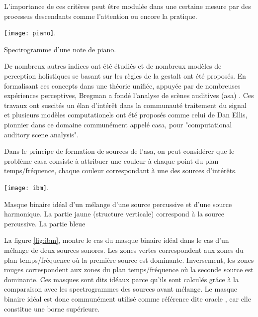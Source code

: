 L'importance de ces critères peut être modulée dans une certaine mesure par des processus descendants comme l'attention ou encore la pratique.

\begin{marginfigure}
  \texttt{[image: piano]}.
  \caption{Spectrogramme d'une note de piano.}
  \label{fig:piano}
\end{marginfigure}

De nombreux autres indices ont été étudiés et de nombreux modèles de perception holistiques se basant sur les règles de la gestalt ont été proposés. En formalisant ces concepts dans une théorie unifiée, appuyée par de nombreuses expériences perceptives, Bregman a fondé l'analyse de scènes auditives (asa) \cite{bregman1994auditory}. Ces travaux ont suscités un élan d'intérêt dans la communauté traitement du signal et plusieurs modèles computationels ont été proposés comme celui de Dan Ellis\cite{ellis}, pionnier dans ce domaine communément appelé casa, pour "computational auditory scene analysis".


Dans le principe de formation de sources de l'asa, on peut considérer que le problème casa consiste à attribuer une couleur à chaque point du plan temps/fréquence, chaque couleur correspondant à une des sources d'intérêts.

\begin{marginfigure}
  \texttt{[image: ibm]}.
  \caption{Masque binaire idéal d'un mélange d'une source percussive et d'une source harmonique. La partie jaune (structure verticale) correspond à la source percussive. La partie bleue}
\end{marginfigure}

La figure \ref{fig:ibm}, montre le cas du masque binaire idéal dans le cas d'un mélange de deux sources sonores. Les zones vertes correspondent aux zones du plan temps/fréquence où la première source est dominante. Inversement, les zones rouges correspondent aux zones du plan temps/fréquence où la seconde source est dominante. Ces masques sont dits idéaux parce qu'ils sont calculés grâce à la comparaison avec les spectrogrammes des sources avant mélange. Le masque binaire idéal est donc communément utilisé comme référence dite \og oracle \fg, car elle constitue une borne supérieure.

